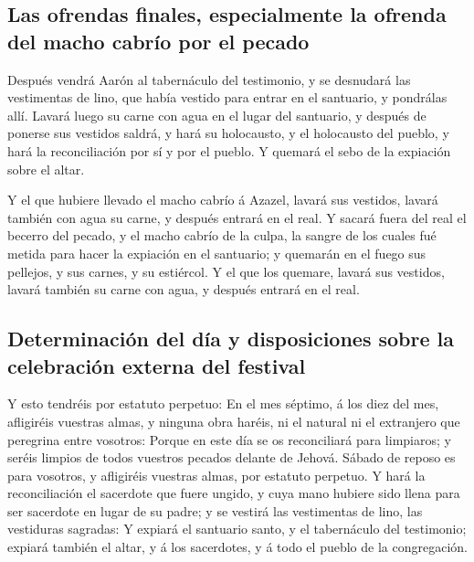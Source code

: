 \hypertarget{las-ofrendas-finales-especialmente-la-ofrenda-del-macho-cabruxedo-por-el-pecado}{%
\subsection{Las ofrendas finales, especialmente la ofrenda del macho
cabrío por el
pecado}\label{las-ofrendas-finales-especialmente-la-ofrenda-del-macho-cabruxedo-por-el-pecado}}

 Después vendrá Aarón al tabernáculo del testimonio, y se
desnudará las vestimentas de lino, que había vestido para entrar en el
santuario, y pondrálas allí.  Lavará luego su carne con
agua en el lugar del santuario, y después de ponerse sus vestidos
saldrá, y hará su holocausto, y el holocausto del pueblo, y hará la
reconciliación por sí y por el pueblo.  Y quemará el sebo
de la expiación sobre el altar.

 Y el que hubiere llevado el macho cabrío á Azazel,
lavará sus vestidos, lavará también con agua su carne, y después entrará
en el real.  Y sacará fuera del real el becerro del
pecado, y el macho cabrío de la culpa, la sangre de los cuales fué
metida para hacer la expiación en el santuario; y quemarán en el fuego
sus pellejos, y sus carnes, y su estiércol.  Y el que los
quemare, lavará sus vestidos, lavará también su carne con agua, y
después entrará en el real.

\hypertarget{determinaciuxf3n-del-duxeda-y-disposiciones-sobre-la-celebraciuxf3n-externa-del-festival}{%
\subsection{Determinación del día y disposiciones sobre la celebración
externa del
festival}\label{determinaciuxf3n-del-duxeda-y-disposiciones-sobre-la-celebraciuxf3n-externa-del-festival}}

 Y esto tendréis por estatuto perpetuo: En el mes
séptimo, á los diez del mes, afligiréis vuestras almas, y ninguna obra
haréis, ni el natural ni el extranjero que peregrina entre vosotros:
 Porque en este día se os reconciliará para limpiaros; y
seréis limpios de todos vuestros pecados delante de Jehová.
 Sábado de reposo es para vosotros, y afligiréis vuestras
almas, por estatuto perpetuo.  Y hará la reconciliación
el sacerdote que fuere ungido, y cuya mano hubiere sido llena para ser
sacerdote en lugar de su padre; y se vestirá las vestimentas de lino,
las vestiduras sagradas:  Y expiará el santuario santo, y
el tabernáculo del testimonio; expiará también el altar, y á los
sacerdotes, y á todo el pueblo de la congregación.

